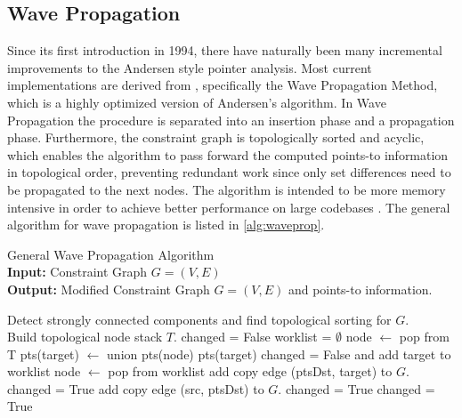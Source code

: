 \subsection{Wave Propagation}
Since its first introduction in 1994, there have naturally been many incremental improvements to the Andersen style pointer analysis.
Most current implementations are derived from \cite{waveprop}, specifically the Wave Propagation Method, which is a highly optimized version of Andersen's algorithm.
In Wave Propagation the procedure is separated into an insertion phase and a propagation phase. Furthermore, the constraint graph is topologically sorted and acyclic, which enables the algorithm to pass forward the computed points-to information in topological order, preventing redundant work since only set differences need to be propagated to the next nodes. The algorithm is intended to be more memory intensive in order to achieve better performance on large codebases \cite{waveprop}.
The general algorithm for wave propagation is listed in \autoref{alg:waveprop}.

\begin{algorithm}
    \caption[General Wave Propagation Algorithm]{General Wave Propagation Algorithm \\ \textbf{Input:} Constraint Graph $G=(V,E)$ \\ \textbf{Output:} Modified Constraint Graph $G=(V,E)$ and points-to information.}\label{alg:waveprop}
    \begin{algorithmic}
        \State Detect strongly connected components and find topological sorting for $G$. \\ Build topological node stack $T$.
        \Repeat
        \State changed = False
        \State worklist = $\emptyset$
        \State node $\leftarrow$ pop from T
        \State pts(target) $\leftarrow$ union pts(node) pts(target)
        \State changed = False and add target to worklist
        \EndIf
        \EndFor
        \EndWhile
        \State node $\leftarrow$ pop from worklist
        \State add copy edge (ptsDst, target) to $G$.
        \State changed = True
        \EndIf
        \EndFor
        \EndFor
        \State add copy edge (src, ptsDst) to $G$.
        \State changed = True
        \EndIf
        \EndFor
        \EndFor
        \EndWhile
        \State changed = True
        \EndIf
    \end{algorithmic}
\end{algorithm}

